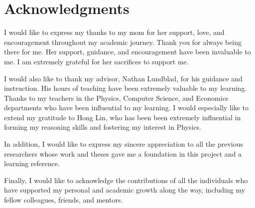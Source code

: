 \chapter*{Acknowledgments}

I would like to express my thanks to my mom for her support, love, and encouragement throughout my academic journey. Thank you for always being there for me. Her support, guidance, and encouragement have been invaluable to me. I am extremely grateful for her sacrifices to support me. 


I would also like to thank my advisor, Nathan Lundblad, for his guidance and instruction. His hours of teaching have been extremely valuable to my learning. Thanks to my teachers in the Physics, Computer Science, and Economics departments who have been influential to my learning. I would especially like to extend my gratitude to Hong Lin, who has been been extremely influential in forming my reasoning skills and fostering my interest in Physics. \cite{nlundblad} \cite{hlin}


In addition, I would like to express my sincere appreciation to all the previous researchers whose work and theses gave me a foundation in this project and a learning reference. \cite{sshea}\cite{mcwik}\cite{dpaseltiner}


Finally, I would like to acknowledge the contributions of all the individuals who have supported my personal and academic growth along the way, including my fellow colleagues, friends, and mentors. 




